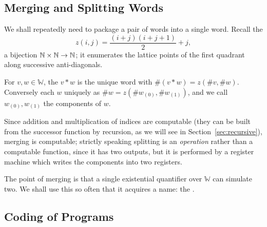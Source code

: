 \documentclass[a4paper]{scrartcl}
\newcommand{\WW}{\mathbb{W}}
\begin{document}
\subsection{Merging and Splitting Words}

We shall repeatedly need to package a pair of words into a single word. Recall the 
$$z(i,j) = \frac{(i+j)(i+j+1)}{2}+j,$$
a bijection $\mathbb{N}\times\mathbb{N}\to\mathbb{N}$; it enumerates the lattice points of the first quadrant along successive anti-diagonals.

\begin{definition}
	For $v,w \in \WW$, the  $v \ast w$ is the unique word with $\#(v\ast w) = z(\#v, \#w)$. Conversely each $w$  uniquely as $\#w = z(\#w_{(0)}, \#w_{(1)})$, and we call $w_{(0)}, w_{(1)}$ the components of $w$.
\end{definition}

Since addition and multiplication of indices are computable (they can be built from the successor function by recursion, as we will see in Section~\ref{sec:recursive}), merging is computable; strictly speaking splitting is an \emph{operation} rather than a computable function, since it has two outputs, but it is performed by a register machine which writes the components into two registers.

The point of merging is that a single existential quantifier over $\WW$ can simulate two. We shall use this so often that it acquires a name: the .

\subsection{Coding of Programs}
\end{document}
